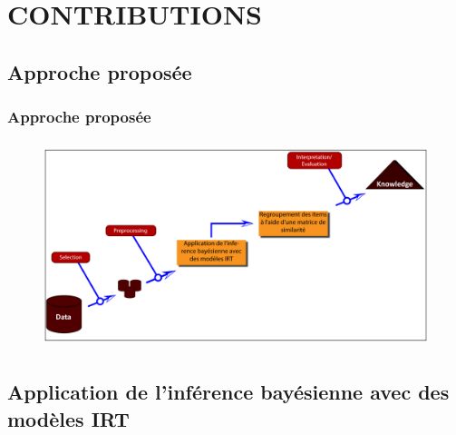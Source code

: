 \documentclass[aspectratio=169,professionalfonts, 12pt]{beamer}
\begin{document}
\section{CONTRIBUTIONS}

\subsection{Approche proposée}

\begin{frame}
  \frametitle{Approche proposée}
  \justifying 
  \begin{minipage}{\textwidth}
  \begin{figure}[H]
      \includegraphics[height=6cm]{images/contribution/approch.png}
  \end{figure}
  \end{minipage}
\end{frame}

\subsection{Application de l'inférence bayésienne avec des modèles IRT}
\end{document}
